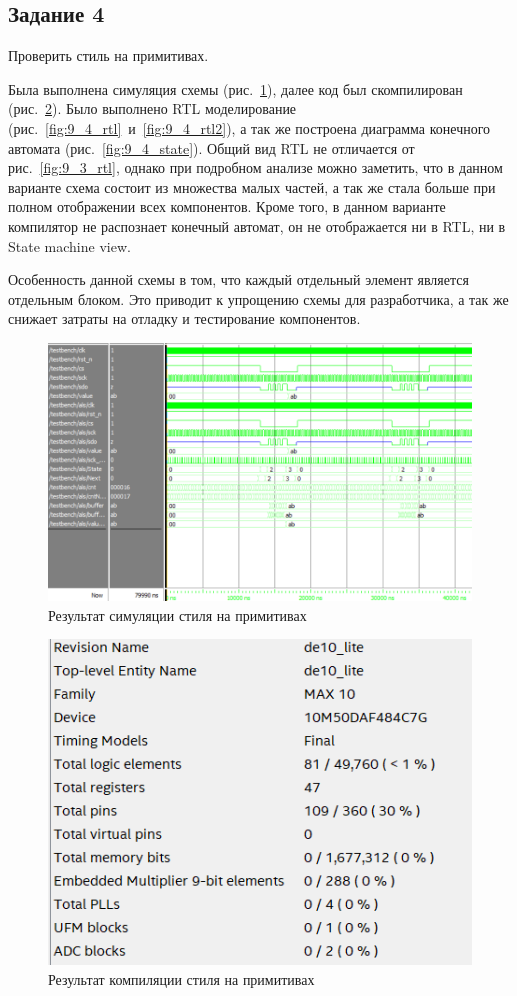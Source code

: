 \documentclass[a4paper,14pt]{article}
\begin{document}
	\subsection{Задание 4}

	Проверить стиль на примитивах.
	
	Была выполнена симуляция схемы (рис.~\ref{fig:9_4_wave}), далее код был скомпилирован (рис.~\ref{fig:9_4_compilation}).
	Было выполнено RTL моделирование (рис.~\ref{fig:9_4_rtl}~и~\ref{fig:9_4_rtl2}), а так же построена диаграмма конечного автомата (рис.~\ref{fig:9_4_state}).
	Общий вид RTL не отличается от рис.~\ref{fig:9_3_rtl}, однако при подробном анализе можно заметить, что в данном варианте схема состоит из множества малых частей, а так же стала больше при полном отображении всех компонентов.
	Кроме того, в данном варианте компилятор не распознает конечный автомат, он не отображается ни в RTL, ни в State machine view.
	
	Особенность данной схемы в том, что каждый отдельный элемент является отдельным блоком.
	Это приводит к упрощению схемы для разработчика, а так же снижает затраты на отладку и тестирование компонентов. 
	
	\begin{figure}[H]
		\centering
		\includegraphics[width=0.9\linewidth]{images/9_4_wave}
		\caption{Результат симуляции стиля на примитивах}
		\label{fig:9_4_wave}
	\end{figure}
	
	\begin{figure}[H]
		\centering
		\includegraphics[width=0.5\linewidth]{images/9_4_compilation}
		\caption{Результат компиляции стиля на примитивах}
		\label{fig:9_4_compilation}
	\end{figure}
	
\end{document}
